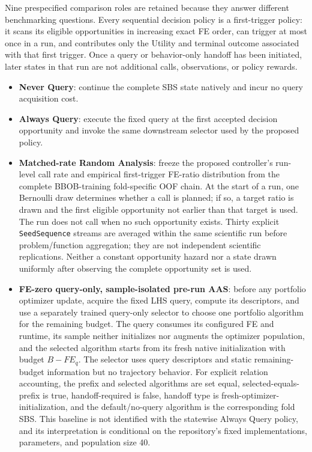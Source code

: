 Nine prespecified comparison roles are retained because they answer different
benchmarking questions.  Every sequential decision policy is a first-trigger
policy: it scans its eligible opportunities in increasing exact FE order, can
trigger at most once in a run, and contributes only the Utility and terminal
outcome associated with that first trigger.  Once a query or behavior-only
handoff has been initiated, later states in that run are not additional calls,
observations, or policy rewards.
\begin{itemize}
  \item \textbf{Never Query}: continue the complete SBS state natively and incur no query acquisition cost.
  \item \textbf{Always Query}: execute the fixed query at the first accepted decision opportunity and invoke the same downstream selector used by the proposed policy.
  \item \textbf{Matched-rate Random Analysis}: freeze the proposed controller's run-level call rate and empirical first-trigger FE-ratio distribution from the complete BBOB-training fold-specific OOF chain.  At the start of a run, one Bernoulli draw determines whether a call is planned; if so, a target ratio is drawn and the first eligible opportunity not earlier than that target is used.  The run does not call when no such opportunity exists.  Thirty explicit \texttt{SeedSequence} streams are averaged within the same scientific run before problem/function aggregation; they are not independent scientific replications.  Neither a constant opportunity hazard nor a state drawn uniformly after observing the complete opportunity set is used.
  \item \textbf{FE-zero query-only, sample-isolated pre-run AAS}: before any portfolio optimizer update, acquire the fixed LHS query, compute its descriptors, and use a separately trained query-only selector to choose one portfolio algorithm for the remaining budget.  The query consumes its configured FE and runtime, its sample neither initializes nor augments the optimizer population, and the selected algorithm starts from its fresh native initialization with budget $B-FE_q$.  The selector uses query descriptors and static remaining-budget information but no trajectory behavior.  For explicit relation accounting, the prefix and selected algorithms are set equal, selected-equals-prefix is true, handoff-required is false, handoff type is fresh-optimizer-initialization, and the default/no-query algorithm is the corresponding fold SBS.  This baseline is not identified with the statewise Always Query policy, and its interpretation is conditional on the repository's fixed implementations, parameters, and population size 40.

\end{itemize}
